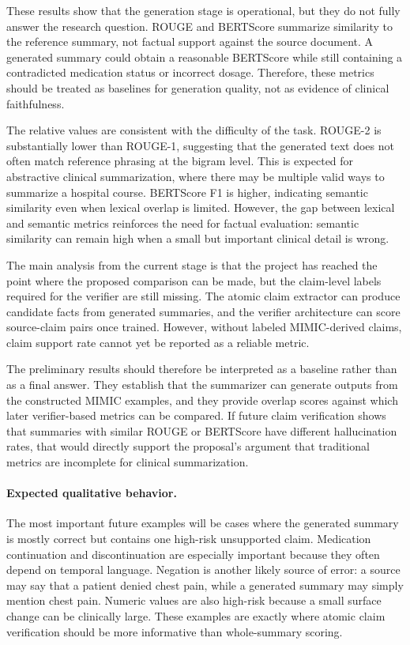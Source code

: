 \documentclass[11pt]{article}
\begin{document}
These results show that the generation stage is operational, but they do not fully answer the research question. ROUGE and BERTScore summarize similarity to the reference summary, not factual support against the source document. A generated summary could obtain a reasonable BERTScore while still containing a contradicted medication status or incorrect dosage. Therefore, these metrics should be treated as baselines for generation quality, not as evidence of clinical faithfulness.

The relative values are consistent with the difficulty of the task. ROUGE-2 is substantially lower than ROUGE-1, suggesting that the generated text does not often match reference phrasing at the bigram level. This is expected for abstractive clinical summarization, where there may be multiple valid ways to summarize a hospital course. BERTScore F1 is higher, indicating semantic similarity even when lexical overlap is limited. However, the gap between lexical and semantic metrics reinforces the need for factual evaluation: semantic similarity can remain high when a small but important clinical detail is wrong.

The main analysis from the current stage is that the project has reached the point where the proposed comparison can be made, but the claim-level labels required for the verifier are still missing. The atomic claim extractor can produce candidate facts from generated summaries, and the verifier architecture can score source-claim pairs once trained. However, without labeled MIMIC-derived claims, claim support rate cannot yet be reported as a reliable metric.

The preliminary results should therefore be interpreted as a baseline rather than as a final answer. They establish that the summarizer can generate outputs from the constructed MIMIC examples, and they provide overlap scores against which later verifier-based metrics can be compared. If future claim verification shows that summaries with similar ROUGE or BERTScore have different hallucination rates, that would directly support the proposal's argument that traditional metrics are incomplete for clinical summarization.

\paragraph{Expected qualitative behavior.}
The most important future examples will be cases where the generated summary is mostly correct but contains one high-risk unsupported claim. Medication continuation and discontinuation are especially important because they often depend on temporal language. Negation is another likely source of error: a source may say that a patient denied chest pain, while a generated summary may simply mention chest pain. Numeric values are also high-risk because a small surface change can be clinically large. These examples are exactly where atomic claim verification should be more informative than whole-summary scoring.
\end{document}
